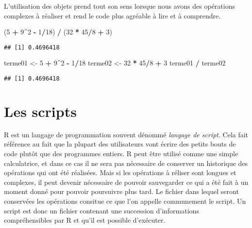 \documentclass[]{book}
\newenvironment{Shaded}{\begin{snugshade}}{\end{snugshade}}
\newcommand{\DecValTok}[1]{\textcolor[rgb]{0.00,0.00,0.81}{#1}}
\newcommand{\StringTok}[1]{\textcolor[rgb]{0.31,0.60,0.02}{#1}}
\newcommand{\OperatorTok}[1]{\textcolor[rgb]{0.81,0.36,0.00}{\textbf{#1}}}
\newcommand{\NormalTok}[1]{#1}
\theoremstyle{definition}
\theoremstyle{definition}
\theoremstyle{definition}
\theoremstyle{remark}
\begin{document}
L'utilisation des objets prend tout son sens lorsque nous avons des
opérations complexes à réaliser et rend le code plus agréable à lire et
à comprendre.

\begin{Shaded}
\begin{Highlighting}[]
\NormalTok{(}\DecValTok{5} \OperatorTok{+}\StringTok{ }\DecValTok{9}\OperatorTok{^}\DecValTok{2} \OperatorTok{-}\StringTok{ }\DecValTok{1}\OperatorTok{/}\DecValTok{18}\NormalTok{) }\OperatorTok{/}\StringTok{ }\NormalTok{(}\DecValTok{32} \OperatorTok{*}\StringTok{ }\DecValTok{45}\OperatorTok{/}\DecValTok{8} \OperatorTok{+}\StringTok{ }\DecValTok{3}\NormalTok{)}
\end{Highlighting}
\end{Shaded}

\begin{verbatim}
## [1] 0.4696418
\end{verbatim}

\begin{Shaded}
\begin{Highlighting}[]
\NormalTok{terme01 <-}\StringTok{ }\DecValTok{5} \OperatorTok{+}\StringTok{ }\DecValTok{9}\OperatorTok{^}\DecValTok{2} \OperatorTok{-}\StringTok{ }\DecValTok{1}\OperatorTok{/}\DecValTok{18}
\NormalTok{terme02 <-}\StringTok{ }\DecValTok{32} \OperatorTok{*}\StringTok{ }\DecValTok{45}\OperatorTok{/}\DecValTok{8} \OperatorTok{+}\StringTok{ }\DecValTok{3}
\NormalTok{terme01 }\OperatorTok{/}\StringTok{ }\NormalTok{terme02}
\end{Highlighting}
\end{Shaded}

\begin{verbatim}
## [1] 0.4696418
\end{verbatim}

\section{Les scripts}\label{les-scripts}

R est un langage de programmation souvent dénommé \emph{langage de
script}. Cela fait référence au fait que la plupart des utilisateurs
vont écrire des petits bouts de code plutôt que des programmes entiers.
R peut être utilisé comme une simple calculatrice, et dans ce cas il ne
sera pas nécessaire de conserver un historique des opérations qui ont
été réalisées. Mais si les opérations à réliser sont longues et
complexes, il peut devenir nécessaire de pouvoir sauvegarder ce qui a
été fait à un moment donné pour pouvoir poursuivre plus tard. Le fichier
dans lequel seront conservées les opérations consitue ce que l'on
appelle communement le script. Un script est donc un fichier contenant
une succession d'informations compréhensibles par R et qu'il est
possible d'exécuter.
\end{document}
